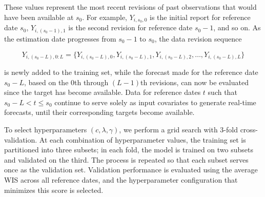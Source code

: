 These values represent the most recent revisions of past observations that would have been available at $s_0$. For example, $Y_{i,s_0,0}$ is the initial report for reference date $s_0$, $Y_{i,(s_0{-}1),1}$ is the second revision for reference date $s_0{-}1$, and so on. As the estimation date progresses from $s_0 -1$ to $s_0$, the data revision sequence

$$ Y_{i,(s_0-L),0:L} = \{Y_{i, (s_0-L), 0}, Y_{i, (s_0-L), 1}, Y_{i, (s_0-L), 2}, \dots, Y_{i, (s_0-L), L}\} $$

is newly added to the training set, while the forecast made for the reference date $s_0{-}L$, based on the 0th through $(L{-}1)$th revisions, can now be evaluated since the target has become available. Data for reference dates $t$ such that $s_0{-}L < t \leq s_0$ continue to serve solely as input covariates to generate real-time forecasts, until their corresponding targets become available.


To select hyperparameters $(c, \lambda, \gamma)$, we perform a grid search with 3-fold cross-validation. At each combination of hyperparameter values, the training set is partitioned into three subsets; in each fold, the model is trained on two subsets and validated on the third. The process is repeated so that each subset serves once as the validation set. Validation performance is evaluated using the average WIS across all reference dates, and the hyperparameter configuration that minimizes this score is selected.


